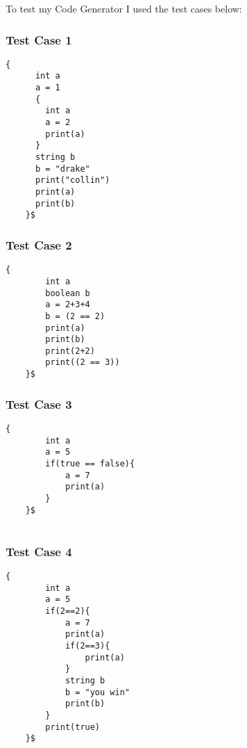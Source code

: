 \documentclass[letterpaper, 10pt,DIV=13]{scrartcl}
\numberwithin{equation}{section} %
\numberwithin{figure}{section} %
\numberwithin{table}{section} %
\begin{document}
To test my Code Generator I used the test cases below:


\subsubsection*{Test Case 1}
    \lstset{numbers=left, numberstyle=\tiny, stepnumber=1, numbersep=5pt, basicstyle=\footnotesize\ttfamily}
    \begin{lstlisting}[frame=single, ]
    {
      int a
      a = 1
      {
        int a
        a = 2
        print(a)
      }
      string b
      b = "drake"
      print("collin")
      print(a)
      print(b)
    }$
    \end{lstlisting}

\subsubsection*{Test Case 2}
    \lstset{numbers=left, numberstyle=\tiny, stepnumber=1, numbersep=5pt, basicstyle=\footnotesize\ttfamily}
    \begin{lstlisting}[frame=single, ]
    {
        int a
        boolean b
        a = 2+3+4
        b = (2 == 2)
        print(a)
        print(b)
        print(2+2)
        print((2 == 3))
    }$
    \end{lstlisting}

\subsubsection*{Test Case 3}
    \lstset{numbers=left, numberstyle=\tiny, stepnumber=1, numbersep=5pt, basicstyle=\footnotesize\ttfamily}
    \begin{lstlisting}[frame=single, ]
    {
        int a
        a = 5
        if(true == false){
            a = 7
            print(a)
        }
    }$
        
    \end{lstlisting}

    \pagebreak

\subsubsection*{Test Case 4}
    \lstset{numbers=left, numberstyle=\tiny, stepnumber=1, numbersep=5pt, basicstyle=\footnotesize\ttfamily}
    \begin{lstlisting}[frame=single, ]
    {
        int a
        a = 5
        if(2==2){
            a = 7
            print(a)
            if(2==3){
                print(a)
            }
            string b
            b = "you win" 
            print(b)
        }
        print(true)
    }$
        
    \end{lstlisting}
\end{document}

